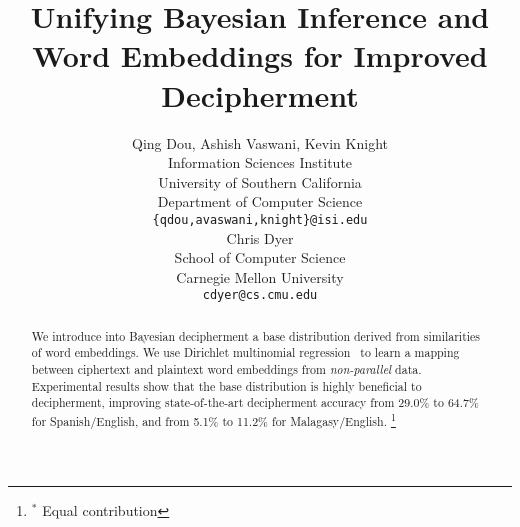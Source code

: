 \documentclass[11pt]{article}
\title{Unifying Bayesian Inference and Word Embeddings for Improved Decipherment}
\author{
Qing Dou\rlap{$^\ast$}, Ashish Vaswani\rlap{$^\ast$}, Kevin Knight \\
Information Sciences Institute \\
University of Southern California \\
Department of Computer Science \\
{\tt \{qdou,avaswani,knight\}@isi.edu}  \\
\AND
Chris Dyer \\
School of Computer Science \\
Carnegie Mellon University \\
{\tt cdyer@cs.cmu.edu} \\
}
\date{}
\begin{document}
\maketitle
\begin{abstract}
We introduce into Bayesian decipherment a base distribution derived from similarities of word embeddings. We use Dirichlet multinomial regression~\cite{mimno2012topic} to learn a mapping between ciphertext and plaintext word embeddings from \emph{non-parallel} data. Experimental results show that the base distribution is highly beneficial to decipherment, improving state-of-the-art decipherment accuracy from 29.0\% to 64.7\% for Spanish/English, and from 5.1\% to 11.2\% for Malagasy/English. %
\let\thefootnote\relax\footnote{$^\ast$ Equal contribution}

 
\end{abstract}




%
%








\end{document}
